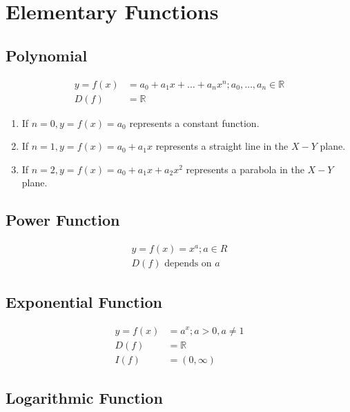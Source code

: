 \documentclass[fleqn]{article}
\theoremstyle{definition}
\theoremstyle{theorem}
\theoremstyle{remark}
\begin{document}
\section{Elementary Functions}

\subsection{Polynomial}

\begin{align}
	y = f(x) &= a_0 + a_1 x + \dots + a_n x^n ; a_0, \dots, a_n \in \mathbb{R} \label{polynomial} \\
	D(f) &= \mathbb{R} \label{domain of polynomial}
\end{align}

\begin{enumerate}
	\item	If $n = 0, y = f(x) = a_0$ represents a constant function.
	\item	If $n = 1, y = f(x) = a_0 + a_1 x$ represents a straight line in the $X-Y$ plane.
	\item	If $n = 2, y = f(x) = a_0 + a_1 x + a_2 x^2$ represents a parabola in the $X-Y$ plane.
\end{enumerate}

\subsection{Power Function}

\begin{align}
	y = f(x) = x^a ; a\in R \label{power function} \\
	D(f) \text{ depends on } a \label{domain of power function}
\end{align}

\subsection{Exponential Function}

\begin{align}
	y = f(x) &= a^x ; a > 0, a \neq 1 \label{exponential function} \\
	D(f) &= \mathbb{R} \label{domain of exponential function} \\
	I(f) &= (0, \infty) \label{image of exponential function}
\end{align}

\subsection{Logarithmic Function}
\end{document}
